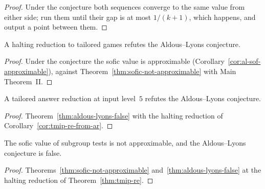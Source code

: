 \begin{proof}
\leanok
Under the conjecture both sequences converge to the same value from either side; run them until
their gap is at most $1/(k+1)$, which happens, and output a point between them.
\end{proof}

\begin{theorem}
\label{thm:aldous-lyons-false}
\leanok
A halting reduction to tailored games refutes the Aldous--Lyons conjecture.
\end{theorem}

\begin{proof}
\leanok
Under the conjecture the sofic value is approximable (Corollary~\ref{cor:al-sof-approximable}),
against Theorem~\ref{thm:sofic-not-approximable} with Main Theorem~II.
\end{proof}

\begin{corollary}
\label{cor:aldous-lyons-false-ar}
\leanok
A tailored answer reduction at input level~$5$ refutes the Aldous--Lyons conjecture.
\end{corollary}

\begin{proof}
\leanok
Theorem~\ref{thm:aldous-lyons-false} with the halting reduction of
Corollary~\ref{cor:tmip-re-from-ar}.
\end{proof}

\begin{corollary}
\label{cor:aldous-lyons-false-final}
\leanok
The sofic value of subgroup tests is not approximable, and the Aldous--Lyons conjecture is false.
\end{corollary}

\begin{proof}
\leanok
Theorems~\ref{thm:sofic-not-approximable} and~\ref{thm:aldous-lyons-false} at the halting
reduction of Theorem~\ref{thm:tmip-re}.
\end{proof}
